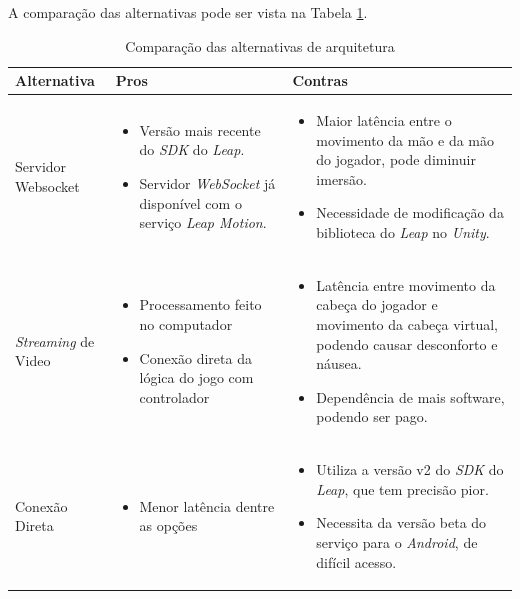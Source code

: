A comparação das alternativas pode ser vista na Tabela \ref{tabela:alternativas-arquiteturas}.

\begin{table}[!h] \scriptsize
	\centering
	\begin{tabular}{|>{\centering\arraybackslash}m{2.1cm}|>{\centering\arraybackslash}m{6cm}|>{\centering\arraybackslash}m{6cm}|}
		\hline 
		\textbf{Alternativa} & \textbf{Pros} & \textbf{Contras} \\
		\hline 
		Servidor Websocket
		&\begin{itemize}[label={--},noitemsep,topsep=0pt,leftmargin=4mm]
			\item Versão mais recente do \textit{SDK} do \textit{Leap}.
			\item Servidor \textit{WebSocket} já disponível com o serviço \textit{Leap Motion}.
		\end{itemize}
		&\begin{itemize}[label={--},noitemsep,topsep=1pt,leftmargin=4mm]
			\item Maior latência entre o movimento da mão e da mão do jogador, pode diminuir imersão.
			\item Necessidade de modificação da biblioteca do \textit{Leap} no \textit{Unity}.
		\end{itemize}
		\\ \hline 
		\textit{Streaming} de Video
		&\begin{itemize}[label={--},noitemsep,topsep=0pt,leftmargin=4mm]
			\item Processamento feito no computador
			\item Conexão direta da lógica do jogo com controlador
		\end{itemize}
		&\begin{itemize}[label={--},noitemsep,topsep=0pt,leftmargin=4mm]
			\item Latência entre movimento da cabeça do jogador e movimento da cabeça virtual, podendo causar desconforto e náusea.
			\item Dependência de mais software, podendo ser pago.
		\end{itemize}
	    \\ \hline 
		Conexão Direta
		&\begin{itemize}[label={--},noitemsep,topsep=0pt,leftmargin=4mm]
				\item Menor latência dentre as opções
			\end{itemize}
		&\begin{itemize}[label={--},noitemsep,topsep=0pt,leftmargin=4mm]
				\item Utiliza a versão v2 do \textit{SDK} do \textit{Leap}, que tem precisão pior.
				\item Necessita da versão beta do serviço para o \textit{Android}, de difícil acesso.
			\end{itemize}
		\\ 
		\hline 
	\end{tabular} 
	\caption[Comparação das alternativas de arquitetura]{Comparação das alternativas de arquitetura}
\label{tabela:alternativas-arquiteturas}
\end{table}

